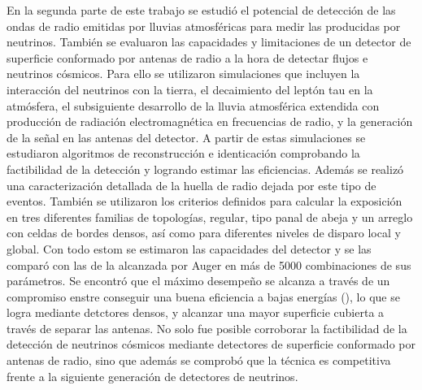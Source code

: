 En la segunda parte de este trabajo se estudi\'o el potencial de detecci\'on de las ondas de radio emitidas por lluvias atmosf\'ericas para medir las producidas por neutrinos.
Tambi\'en se evaluaron las capacidades y limitaciones de un detector de superficie conformado por antenas de radio a la hora de detectar flujos e neutrinos c\'osmicos.
Para ello se utilizaron simulaciones que incluyen la interacci\'on del neutrinos con la tierra, el decaimiento del lept\'on tau en la atm\'osfera, el subsiguiente desarrollo de la lluvia atmosf\'erica extendida con producci\'on de radiaci\'on electromagn\'etica en frecuencias de radio, y la generaci\'on de la se\~nal en las antenas del detector.
A partir de estas simulaciones se estudiaron algoritmos de reconstrucci\'on e identicaci\'on comprobando la factibilidad de la detecci\'on y logrando estimar las eficiencias.
Adem\'as se realiz\'o una caracterizaci\'on detallada de la huella de radio dejada por este tipo de eventos.
Tambi\'en se utilizaron los criterios definidos para calcular la exposici\'on en tres diferentes familias de topolog\'ias, regular, tipo panal de abeja y un arreglo con celdas de bordes densos, as\'i como para diferentes niveles de disparo local y global.
Con todo estom se estimaron las capacidades del detector y se las compar\'o con las de la alcanzada por Auger en m\'as de 5000 combinaciones de sus par\'ametros.
Se encontr\'o que el m\'aximo desempe\~no se alcanza a trav\'es de un compromiso enstre conseguir una buena eficiencia a bajas energ\'ias (), lo que se logra mediante detctores densos, y alcanzar una mayor superficie cubierta a trav\'es de separar las antenas.
No solo fue posible corroborar la factibilidad de la detecci\'on de neutrinos c\'osmicos mediante detectores de superficie conformado por antenas de radio, sino que adem\'as se comprob\'o que la t\'ecnica es competitiva frente a la siguiente generaci\'on de detectores de neutrinos.